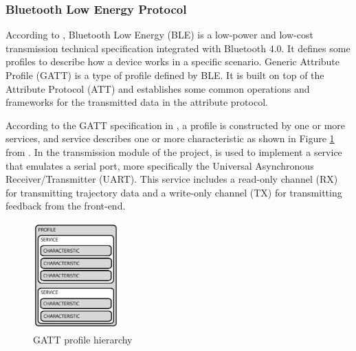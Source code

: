 \subsubsection{Bluetooth Low Energy Protocol}
According to \textcite{bluetooth}, Bluetooth Low Energy (BLE) is a low-power and low-cost transmission technical specification integrated with Bluetooth 4.0. It defines some profiles to describe how a device works in a specific scenario. Generic Attribute Profile (GATT) is a type of profile defined by BLE. It is built on top of the Attribute Protocol (ATT) and establishes some common operations and frameworks for the transmitted data in the attribute protocol.
\par
According to the GATT specification in \textcite{bluetooth}, a profile is constructed by one or more services, and service describes one or more characteristic as shown in Figure \ref{fig:gatt} from \textcite{ble}. In the transmission module of the project, \textcite{nus} is used to implement a service that emulates a serial port, more specifically the Universal Asynchronous Receiver/Transmitter (UART). This service includes a read-only channel (RX) for transmitting trajectory data and a write-only channel (TX) for transmitting feedback from the front-end. 
\begin{figure}[H]
    \centering
    \includegraphics[width=0.3\textwidth]{figure/gatt.jpg}
    \caption{GATT profile hierarchy}
    \label{fig:gatt}
\end{figure}


